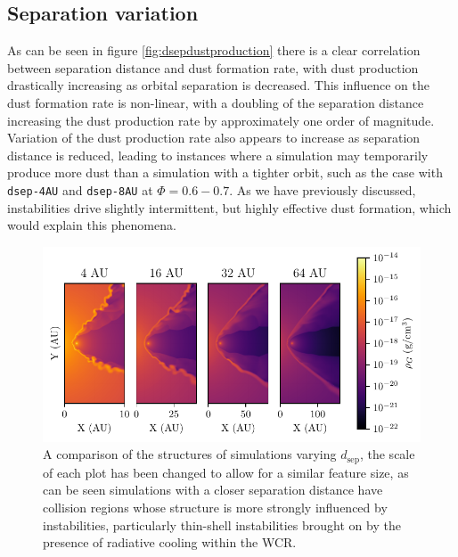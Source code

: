 
\subsection{Separation variation}


As can be seen in figure \ref{fig:dsepdustproduction} there is a clear correlation between separation distance and dust formation rate, with dust production drastically increasing as orbital separation is decreased.
This influence on the dust formation rate is non-linear, with a doubling of the separation distance increasing the dust production rate by approximately one order of magnitude.
Variation of the dust production rate also appears to increase as separation distance is reduced, leading to instances where a simulation may temporarily produce more dust than a simulation with a tighter orbit, such as the case with \texttt{dsep-4AU} and \texttt{dsep-8AU} at $\Phi = 0.6-0.7$.
As we have previously discussed, instabilities drive slightly intermittent, but highly effective dust formation, which would explain this phenomena.

\begin{figure}
  \centering
  \includegraphics{assets/adiabatic-flow/instab-comp-rho.pdf}
  \caption[]{A comparison of the structures of simulations varying $d_\text{sep}$, the scale of each plot has been changed to allow for a similar feature size, as can be seen simulations with a closer separation distance have collision regions whose structure is more strongly influenced by instabilities, particularly thin-shell instabilities brought on by the presence of radiative cooling within the WCR.}
  \label{fig:dsepinstabilities}
\end{figure}

